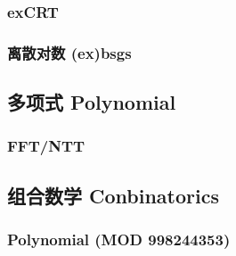 

\subsubsection{exCRT}


\subsubsection{离散对数 (ex)bsgs}



\subsection{多项式 Polynomial}

\subsubsection{FFT/NTT}



\subsection{组合数学 Conbinatorics}


\subsubsection{Polynomial (MOD 998244353)}


